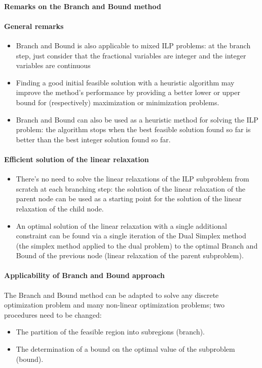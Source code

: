 \paragraph{Remarks on the Branch and Bound method}

\paragraph*{General remarks}
\begin{itemize}
    \item Branch and Bound is also applicable to mixed ILP problems: at the branch step, just consider that the fractional variables are integer and the integer variables are continuous
    \item Finding a good initial feasible solution with a heuristic algorithm may improve the method's performance by providing a better lower or upper bound for (respectively) maximization or minimization problems.
    \item Branch and Bound can also be used as a heuristic method for solving the ILP problem: the algorithm stops when the best feasible solution found so far is better than the best integer solution found so far.
\end{itemize}

\paragraph*{Efficient solution of the linear relaxation}
\begin{itemize}
    \item There's no need to solve the linear relaxations of the ILP subproblem from scratch at each branching step: the solution of the linear relaxation of the parent node can be used as a starting point for the solution of the linear relaxation of the child node.
    \item An optimal solution of the linear relaxation with a single additional constraint can be found via a single iteration of the Dual Simplex method (the simplex method applied to the dual problem) to the optimal Branch and Bound of the previous node (linear relaxation of the parent subproblem).
\end{itemize}

\paragraph*{Applicability of Branch and Bound approach}

The Branch and Bound method can be adapted to solve any discrete optimization problem and many non-linear optimization problems;
two procedures need to be changed:
\begin{itemize}
    \item The partition of the feasible region into subregions (branch).
    \item The determination of a bound on the optimal value of the subproblem (bound).
\end{itemize}

